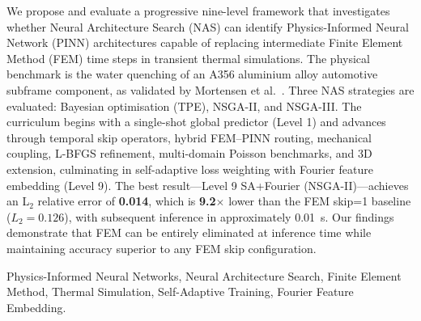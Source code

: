 \documentclass[10pt, twocolumn]{article}
\begin{document}

We propose and evaluate a progressive nine-level
framework that investigates whether Neural Architecture Search (NAS) can identify
Physics-Informed Neural Network (PINN) architectures capable of replacing intermediate
Finite Element Method (FEM) time steps in transient thermal simulations.
The physical benchmark is the water quenching of an A356 aluminium alloy automotive
subframe component, as validated by Mortensen et al.~\cite{mortensen2026}.
Three NAS strategies are evaluated: Bayesian optimisation (TPE), NSGA-II, and NSGA-III.
The curriculum begins with a single-shot global predictor (Level 1) and advances through
temporal skip operators, hybrid FEM--PINN routing, mechanical coupling, L-BFGS
refinement, multi-domain Poisson benchmarks, and 3D extension, culminating in
self-adaptive loss weighting with Fourier feature embedding (Level 9).
The best result---Level 9 SA+Fourier (NSGA-II)---achieves an L$_2$ relative error of
\textbf{0.014}, which is \textbf{9.2$\times$} lower than the FEM skip=1 baseline
($L_2=0.126$), with subsequent inference in approximately 0.01~s.
Our findings demonstrate that FEM can be entirely eliminated at inference time while
maintaining accuracy superior to any FEM skip configuration.

\medskip
{}Physics-Informed Neural Networks, Neural Architecture Search,
Finite Element Method, Thermal Simulation, Self-Adaptive Training, Fourier Feature Embedding.
\end{document}
